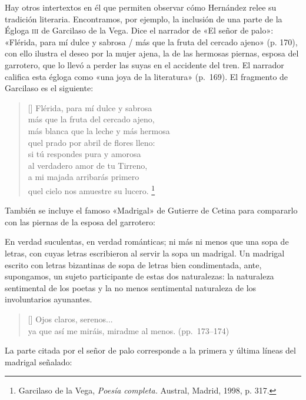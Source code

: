\documentclass[14pt,twoside,final]{extbook} %
\let\oldfootnote\footnote
\renewcommand\footnote[1]{%
\oldfootnote{\hspace{1mm}#1}}
\begin{document}
Hay otros intertextos en él que permiten observar cómo Hernández relee su tradición literaria. Encontramos, por ejemplo, la inclusión de una parte de la Égloga \textsc{iii} de Garcilaso de la Vega. Dice el narrador de «El señor de palo»: «Flérida, para mí dulce y sabrosa / más que la fruta del cercado ajeno» (p. 170), con ello ilustra el deseo por la mujer ajena, la de las hermosas piernas, esposa del garrotero, que lo llevó a perder las suyas en el accidente del tren. El narrador califica esta égloga como «una joya de la literatura» (p.~169). El fragmento de Garcilaso es el siguiente:
\settowidth{\versewidth}{más blanca que la leche y más hermosa}
\begin{verse}[\versewidth]
Flérida, para mí dulce y sabrosa \\
más que la fruta del cercado ajeno, \\
más blanca que la leche y más hermosa \\
qu\textquotesingle{}el prado por abril de flores lleno: \\
si tú respondes pura y amorosa \\
al verdadero amor de tu Tirreno, \\
a mi majada arribarás primero \\
qu\textquotesingle{}el cielo nos amuestre su lucero.\footnote{Garcilaso de la Vega, \emph{Poesía completa.} Austral, Madrid, 1998, p. 317.}
\end{verse}
También se incluye el famoso «Madrigal» de Gutierre de Cetina para compararlo con las piernas de la esposa del garrotero:
\begin{quoting}
En verdad suculentas, en verdad románticas; ni más ni menos que una sopa de letras, con cuyas letras escribieron al servir la sopa un madrigal. Un madrigal escrito con letras bizantinas
de sopa de letras bien condimentada, ante, supongamos, un sujeto participante de estas dos naturalezas: la naturaleza sentimental de los poetas y la no menos sentimental naturaleza de los involuntarios ayunantes.
\begin{verse}[\versewidth]
Ojos claros, serenos... \\
ya que así me miráis, miradme al menos. (pp.~\mbox{173--174})
\end{verse}
\end{quoting}
La parte citada por el señor de palo corresponde a la primera y última líneas del madrigal señalado:
\settowidth{\versewidth}{ya que así me miráis, miradme al menos.}
\end{document}
